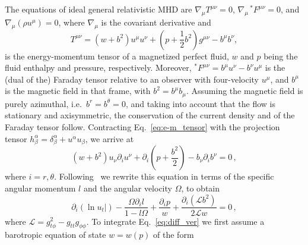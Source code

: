 \documentclass{aa}
\begin{document}
The equations of ideal general relativistic MHD are $\nabla_{\mu} T^{\mu\nu} = 0$, $\nabla_{\mu} \,^\ast F^{\mu\nu} = 0$, and 
$\nabla_{\mu} (\rho u^{\mu}) = 0$, 
where $\nabla_{\mu}$ is the covariant derivative and
\begin{equation}\label{eq:e-m_tensor}
T^{\mu\nu} = (w + b^2)u^{\mu}u^{\nu} + \left(p + \frac{1}{2}b^2\right)g^{\mu\nu} - b^{\mu}b^{\nu},
\end{equation}
is the energy-momentum tensor of a magnetized perfect fluid, $w$ and $p$ being the fluid enthalpy and pressure, respectively. 
Moreover,
$^\ast F^{\mu\nu} = b^{\mu}u^{\nu} - b^{\nu}u^{\mu}$
is the (dual of the) Faraday tensor relative to an observer with four-velocity $u^{\mu}$, and $b^{\mu}$ is the magnetic field in that frame, with
$b^2=b^{\mu}b_{\mu}$. Assuming the magnetic field is purely azimuthal, i.e.~$b^r = b^{\theta} = 0$,
and taking into account that the flow is stationary and axisymmetric, the conservation of the current density and of the Faraday tensor follow. Contracting Eq.~\eqref{eq:e-m_tensor} with the projection tensor $h^{\alpha}_{\beta} = \delta^{\alpha}_{\beta} + u^{\alpha}u_{\beta}$, we arrive at
\begin{equation}
(w + b^2)u_{\nu}\partial_i u^{\nu} + \partial_i\left(p + \frac{b^2}{2}\right) - b_{\nu}\partial_i b^{\nu}=0\,,
\end{equation}
where $i = r, \theta$. Following~\cite{Komissarov:2006} we rewrite this equation in terms of the specific angular momentum $l$ and the angular velocity $\Omega$, to obtain
\begin{equation}\label{eq:diff_ver}
\partial_i(\ln u_t|) - \frac{\Omega \partial_i l}{1-l\Omega} + \frac{\partial_i p}{w} + \frac{\partial_i(\mathcal{L}b^2)}{2\mathcal{L}w} = 0\,,
\end{equation}
where $\mathcal{L} = g_{t\phi}^2 - g_{tt}g_{\phi\phi}$.
To integrate Eq.~\eqref{eq:diff_ver} we first assume a barotropic equation of state $w = w(p)$ of the form
\end{document}
